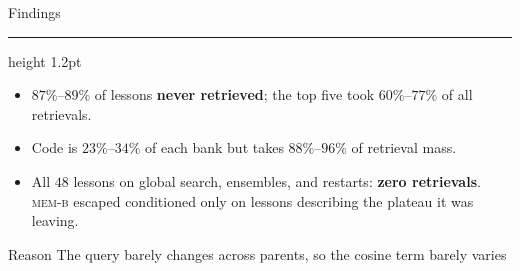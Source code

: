 \documentclass[aspectratio=169]{beamer}
\newcommand{\titlerule}{{\color{titledred}\hrule height 1.2pt}}
\begin{document}
\begin{frame}{Findings}
\vspace{-3em}
\titlerule
\vspace{1.6em}

\begin{itemize}
  \item $87\%$--$89\%$ of lessons \textbf{never retrieved}; the top five took
        $60\%$--$77\%$ of all retrievals.
  \item Code is $23\%$--$34\%$ of each bank but takes $88\%$--$96\%$ of
        retrieval mass.
  \item All $48$ lessons on global search, ensembles, and restarts:
        \textbf{zero retrievals}. \textsc{mem-b} escaped conditioned only on
        lessons describing the plateau it was leaving.
\end{itemize}

\vspace{1.8em}
\begin{block}{Reason}
The query barely changes across parents, so
the cosine term barely varies
\end{block}
\end{frame}
\end{document}
